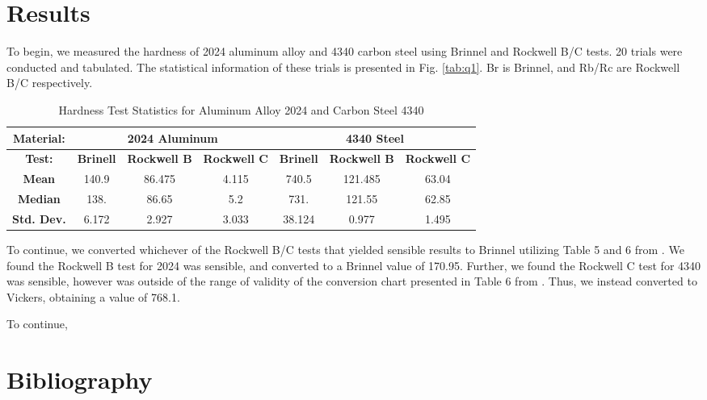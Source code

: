 \documentclass{article}
\begin{document}
\newpage
\section{Results}
To begin, we measured the hardness of 2024 aluminum alloy and 4340 carbon steel using Brinnel and Rockwell B/C tests. 20 trials were conducted and tabulated. The statistical information of these trials is presented in Fig. \ref{tab:q1}. Br is Brinnel, and Rb/Rc are Rockwell B/C respectively. 

\begin{table}[hp]
    \def\arraystretch{1.5}
    \centering
    \caption{Hardness Test Statistics for Aluminum Alloy 2024 and Carbon Steel 4340}
    \label{table:q1}
    \begin{tabular}{|c|c|c|c|c|c|c|}
    \toprule
    \hline
    \multicolumn{1}{|c|}{\textbf{Material:}} & \multicolumn{3}{|c|}{\textbf{2024 Aluminum}} & \multicolumn{3}{|c|}{\textbf{4340 Steel}} \\ \hline
    \textbf{Test:} & \textbf{Brinell} & \textbf{Rockwell B} & \textbf{Rockwell C} & \textbf{Brinell} & \textbf{Rockwell B} & \textbf{Rockwell C} \\ \hline
    \textbf{Mean} & 140.9 & 86.475 & 4.115 & 740.5 & 121.485 & 63.04 \\
    \textbf{Median} & 138. & 86.65 & 5.2 & 731. & 121.55 & 62.85 \\
    \textbf{Std. Dev.} & 6.172 & 2.927 & 3.033 & 38.124 & 0.977 & 1.495 \\
    \hline
\end{tabular}
\end{table} 

To continue, we converted whichever of the Rockwell B/C tests that yielded sensible results to Brinnel utilizing Table 5 and 6 from \cite{manual}. We found the Rockwell B test for 2024 was sensible, and converted to a Brinnel value of 170.95. Further, we found the Rockwell C test for 4340 was sensible, however was outside of the range of validity of the conversion chart presented in Table 6 from \cite{manual}. Thus, we instead converted to Vickers, obtaining a value of 768.1.

To continue, 


\section{Bibliography}
\printbibliography[heading=none]
\end{document}
